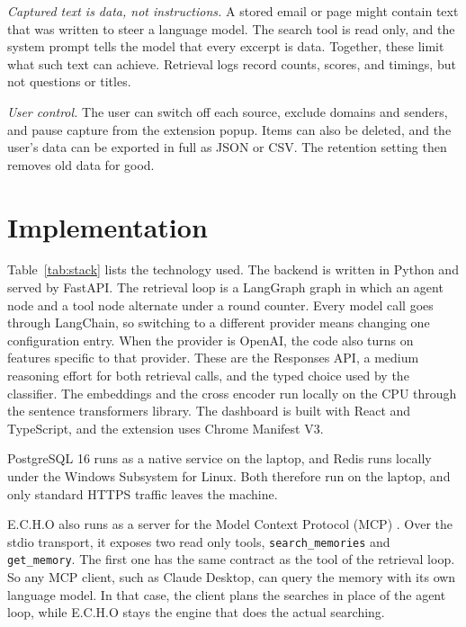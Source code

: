 \documentclass[conference]{IEEEtran}
\begin{document}
\textit{Captured text is data, not instructions.} A stored email or page might contain text that was written to steer a language model. The search tool is read only, and the system prompt tells the model that every excerpt is data. Together, these limit what such text can achieve. Retrieval logs record counts, scores, and timings, but not questions or titles.

\textit{User control.} The user can switch off each source, exclude domains and senders, and pause capture from the extension popup. Items can also be deleted, and the user's data can be exported in full as JSON or CSV. The retention setting then removes old data for good.

\section{Implementation}\label{sec:impl}
Table~\ref{tab:stack} lists the technology used. The backend is written in Python and served by FastAPI. The retrieval loop is a LangGraph graph \cite{b5} in which an agent node and a tool node alternate under a round counter. Every model call goes through LangChain, so switching to a different provider means changing one configuration entry. When the provider is OpenAI, the code also turns on features specific to that provider. These are the Responses API, a medium reasoning effort for both retrieval calls, and the typed choice used by the classifier. The embeddings and the cross encoder run locally on the CPU through the sentence transformers library. The dashboard is built with React and TypeScript, and the extension uses Chrome Manifest V3.

PostgreSQL 16 runs as a native service on the laptop, and Redis runs locally under the Windows Subsystem for Linux. Both therefore run on the laptop, and only standard HTTPS traffic leaves the machine.

E.C.H.O also runs as a server for the Model Context Protocol (MCP) \cite{b17}. Over the stdio transport, it exposes two read only tools, \texttt{search\_memories} and \texttt{get\_memory}. The first one has the same contract as the tool of the retrieval loop. So any MCP client, such as Claude Desktop, can query the memory with its own language model. In that case, the client plans the searches in place of the agent loop, while E.C.H.O stays the engine that does the actual searching.
\end{document}
